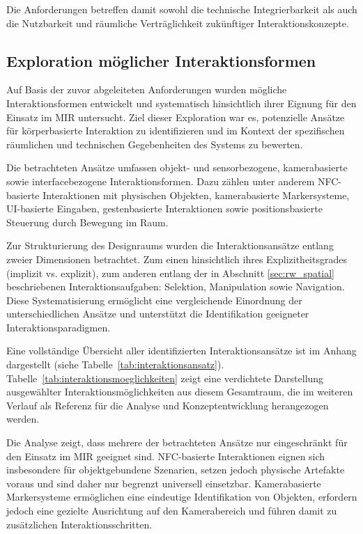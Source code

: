 Die Anforderungen betreffen damit sowohl die technische Integrierbarkeit als auch die Nutzbarkeit und räumliche Verträglichkeit zukünftiger Interaktionskonzepte.


\subsection{Exploration möglicher Interaktionsformen}
Auf Basis der zuvor abgeleiteten Anforderungen wurden mögliche Interaktionsformen entwickelt und systematisch hinsichtlich ihrer Eignung für den Einsatz im MIR untersucht. Ziel dieser Exploration war es, potenzielle Ansätze für körper\-basierte Interaktion zu identifizieren und im Kontext der spezifischen räumlichen und technischen Gegebenheiten des Systems zu bewerten.

Die betrachteten Ansätze umfassen objekt- und sensorbezogene, kamerabasierte sowie interfacebezogene Interaktionsformen.
Dazu zählen unter anderem NFC-basierte Interaktionen mit physischen Objekten, kamerabasierte Markersysteme, UI-basierte Eingaben, gestenbasierte Interaktionen sowie positionsbasierte Steuerung durch Bewegung im Raum.

Zur Strukturierung des Designraums wurden die Interaktionsansätze entlang zweier Dimensionen betrachtet. Zum einen hinsichtlich ihres Explizitheitsgrades (implizit vs. explizit), zum anderen entlang der in Abschnitt \ref{sec:rw_spatial} beschriebenen Interaktionsaufgaben: Selektion, Manipulation sowie Navigation.
Diese Systematisierung ermöglicht eine vergleichende Einordnung der unterschiedlichen Ansätze und unterstützt die Identifikation geeigneter Interaktionsparadigmen.


Eine vollständige Übersicht aller identifizierten Interaktionsansätze ist im Anhang dargestellt (siehe Tabelle~\ref{tab:interaktionsansatz}). Tabelle~\ref{tab:interaktionsmoeglichkeiten} zeigt eine verdichtete Darstellung ausgewählter Interaktionsmöglichkeiten aus diesem Gesamtraum, die im weiteren Verlauf als Referenz für die Analyse und Konzeptentwicklung herangezogen werden.

Die Analyse zeigt, dass mehrere der betrachteten Ansätze nur eingeschränkt für den Einsatz im MIR geeignet sind. NFC-basierte Interaktionen eignen sich insbesondere für objektgebundene Szenarien, setzen jedoch physische Artefakte voraus und sind daher nur begrenzt universell einsetzbar. Kamerabasierte Markersysteme ermög\-lichen eine eindeutige Identifikation von Objekten, erfordern jedoch eine gezielte Ausrichtung auf den Kamerabereich und führen damit zu zusätzlichen Interaktionsschritten.


